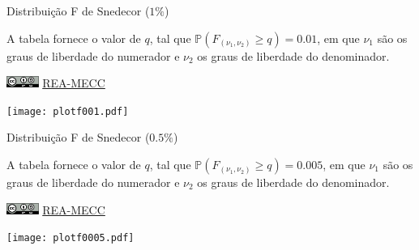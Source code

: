 \documentclass[a4paper,12pt]{article}
\begin{document}
\newpage


\begin{landscape}

\begin{minipage}[l]{\textwidth}
\begin{Huge}
Distribuição F de Snedecor ($1\%$)
\end{Huge}
\par
\vspace{2em}
A tabela fornece o valor de $q$, tal que $\mathbb{P}(F_{(\nu_1, \nu_2)} \geq q) = 0.01$, em que $\nu_1$ são os graus de liberdade do numerador e $\nu_2$ os graus de liberdade do denominador. 
\par\bigskip
\href{https://creativecommons.org/licenses/by-sa/4.0/deed.pt_BR}{\includegraphics[height=1em]{cc-by-sa.pdf}}
\href{https://rea-mecc.github.io}{REA-MECC}
\end{minipage}
\hfill
\begin{minipage}[c]{.35\textwidth}
\texttt{[image: plotf001.pdf]}
\end{minipage}

\addtolength{\tabcolsep}{-0.4pt}


\end{landscape}


\newpage


\begin{landscape}

\begin{minipage}[l]{\textwidth}
\begin{Huge}
Distribuição F de Snedecor ($0.5\%$)
\end{Huge}
\par
\vspace{2em}
A tabela fornece o valor de $q$, tal que $\mathbb{P}(F_{(\nu_1, \nu_2)} \geq q) = 0.005$, em que $\nu_1$ são os graus de liberdade do numerador e $\nu_2$ os graus de liberdade do denominador. 
\par\bigskip
\href{https://creativecommons.org/licenses/by-sa/4.0/deed.pt_BR}{\includegraphics[height=1em]{cc-by-sa.pdf}}
\href{https://rea-mecc.github.io}{REA-MECC}
\end{minipage}
\hfill
\begin{minipage}[c]{.35\textwidth}
\texttt{[image: plotf0005.pdf]}
\end{minipage}

\addtolength{\tabcolsep}{-1.9pt}


\end{landscape}
\end{document}
